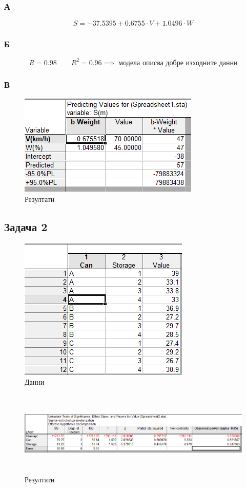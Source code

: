 \documentclass[a4paper,fleqn,12pt]{article}
\begin{document}
\subsubsection{А}
$$
S = -37.5395 + 0.6755 \cdot V + 1.0496 \cdot W
$$

\subsubsection{Б}
$$
R = 0.98 \qquad R^2 = 0.96 \implies \text{ модела описва добре изходните данни}
$$

\newpage
\subsubsection{В}
\begin{figure}[htp!]
  \centering
  \includegraphics{task1-2.png}
  \caption{Резултати}
\end{figure}

\newpage
\subsection{Задача 2}
\begin{figure}[h]
  \centering
  \includegraphics{task2-data.png}
  \caption{Данни}
\end{figure}

\begin{figure}[h]
  \centering
  \includegraphics[width=1.2\linewidth,height= 4cm]{task2.png}
  \caption{Резултати}
\end{figure}
\end{document}
